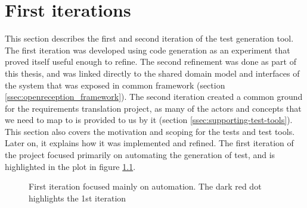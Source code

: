 \chapter{First iterations}
This section describes the first and second iteration of the test generation tool. The first iteration was developed using code generation as an experiment that proved itself useful enough to refine. The second refinement was done as part of this thesis, and was linked directly to the shared domain model and interfaces of the system that was exposed in common framework (section \ref{ssec:openreception_framework}). The second iteration created a common ground for the requirements translation project, as many of the actors and concepts that we need to map to is provided to us by it (section \ref{ssec:supporting-test-tools}).\\
This section also covers the motivation and scoping for the tests and test tools. Later on, it explains how it was implemented and refined. The first iteration of the project focused primarily on automating the generation of test, and is highlighted in the plot in figure \ref{fig:project_parameter_plot_1st_iteration}.
\begin{figure}[!htbp]
\centering
{}
\label{fig:project_parameter_plot_1st_iteration}
\caption{First iteration focused mainly on automation. The dark red dot highlights the 1st iteration}
\end{figure}
